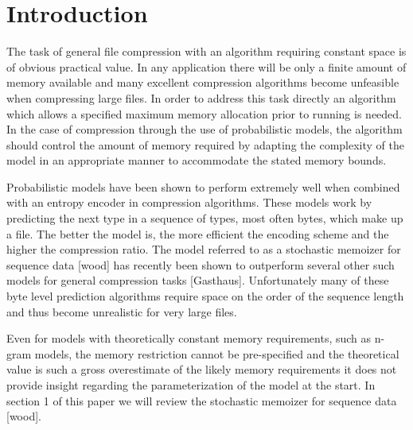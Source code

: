 \section{Introduction}

The task of general file compression with an algorithm requiring constant space is of obvious practical value.  In any application there will be only a finite amount of memory available and many excellent compression algorithms become unfeasible when compressing large files.  In order to address this task directly an algorithm which allows a specified maximum memory allocation prior to running is needed.  In the case of compression through the use of probabilistic models, the algorithm should control the amount of memory required by adapting the complexity of the model in an appropriate manner to accommodate the stated memory bounds.

Probabilistic models have been shown to perform extremely well when combined with an entropy encoder in compression algorithms.  These models work by predicting the next type in a sequence of types, most often bytes, which make up a file.  The better the model is, the more efficient the encoding scheme and the higher the compression ratio.  The model referred to as a stochastic memoizer for sequence data [wood] has recently been shown to outperform several other such models for general compression tasks [Gasthaus].  Unfortunately many of these byte level prediction algorithms require space on the order of the sequence length and thus become unrealistic for very large files.

Even for models with theoretically constant memory requirements, such as n-gram models, the memory restriction cannot be pre-specified and the theoretical value is such a gross overestimate of the likely memory requirements it does not provide insight regarding the parameterization of the model at the start.  In section 1 of this paper we will review the stochastic memoizer for sequence data [wood].
